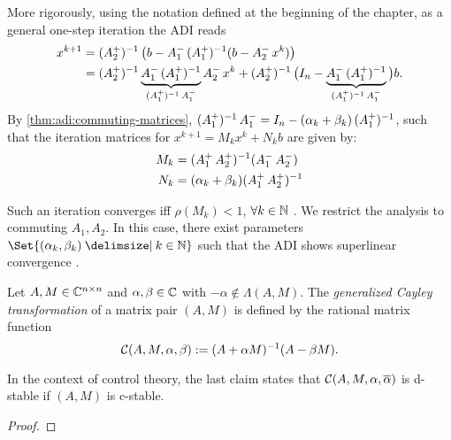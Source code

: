 More rigorously,
using the notation defined at the beginning of the chapter,
as a general one-step iteration the \ac{ADI} reads
\begin{equation*}
\begin{aligned}
  x^{k+1}
  &= \mathop{(\mathop{A_2^+})^{-1}} \big( b - \mathop{A_1^-} \mathop{(\mathop{A_1^+})^{-1}} (b - \mathop{A_2^-} x^k) \big) \\
  &= \mathop{(\mathop{A_2^+})^{-1}} \underbrace{
    \mathop{A_1^-} \mathop{(\mathop{A_1^+})^{-1}}
  }_{
    \mathop{(\mathop{A_1^+})^{-1}} \mathop{A_1^-}
  }
  \mathop{A_2^-} x^k + \mathop{(\mathop{A_2^+})^{-1}} \big( I_n - \underbrace{
    \mathop{A_1^-} \mathop{(\mathop{A_1^+})^{-1}}
  }_{
    \mathop{(\mathop{A_1^+})^{-1}} \mathop{A_1^-}
  }
  \big) b
  .
\end{aligned}
\end{equation*}
By \autoref{thm:adi:commuting-matrices},
$\mathop{(\mathop{A_1^+})^{-1}}\mathop{A_1^-} = I_n - (\alpha_k + \beta_k)\mathop{(\mathop{A_1^+})^{-1}}$,
such that the iteration matrices for $x^{k+1} = M_k x^k + N_k b$ are given by:
\begin{equation}
\label{eq:adi:general1step}
  \begin{aligned}
    M_k &= (\mathop{A_1^+}\mathop{A_2^+})^{-1} (\mathop{A_1^-}\mathop{A_2^-}) \\
    N_k &= (\alpha_k + \beta_k) (\mathop{A_1^+}\mathop{A_2^+})^{-1}
  \end{aligned}
\end{equation}

Such an iteration converges iff $\rho(M_k) < 1$, $\forall k\in\mathbb{N}$ \cite[Theorem~11.2.1]{Golub2013}.
We restrict the analysis to commuting $A_1, A_2$.
In this case,
there exist parameters $\Set{(\alpha_k, \beta_k) \given k\in\N}$
such that the \ac{ADI} shows
superlinear convergence \cite{Beckermann2010}.

\begin{lemma}
\label{thm:adi:cayley}
  Let $A, M\in\mathbb{C}^{n\times n}$ and $\alpha, \beta \in\mathbb{C}$ with $-\alpha\notin\Lambda(A, M)$.
  The \emph{generalized Cayley transformation} of a matrix pair $(A,M)$ is defined by
  the rational matrix function
  \begin{equation*}
    \mathcal{C}(A, M, \alpha, \beta) := (A+\alpha M)^{-1} (A-\beta M).
  \end{equation*}
\end{lemma}
\begin{remark}
  In the context of control theory,
  the last claim states that
  $\Cayley(A, M, \alpha, \conj\alpha)$ is d-stable if
  $(A, M)$ is c-stable.
\end{remark}
\begin{proof}
\end{proof}

